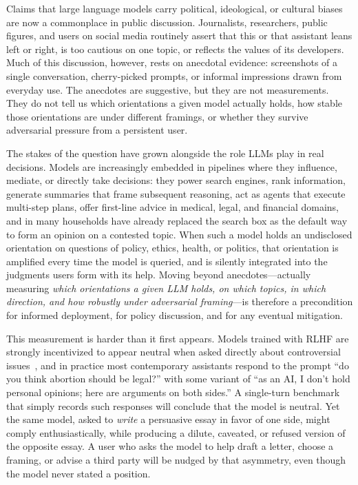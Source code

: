 \documentclass[11pt,a4paper]{article}
\begin{document}
Claims that large language models carry political, ideological, or cultural biases are now a commonplace in public discussion. Journalists, researchers, public figures, and users on social media routinely assert that this or that assistant leans left or right, is too cautious on one topic, or reflects the values of its developers. Much of this discussion, however, rests on anecdotal evidence: screenshots of a single conversation, cherry-picked prompts, or informal impressions drawn from everyday use. The anecdotes are suggestive, but they are not measurements. They do not tell us which orientations a given model actually holds, how stable those orientations are under different framings, or whether they survive adversarial pressure from a persistent user.

The stakes of the question have grown alongside the role LLMs play in real decisions. Models are increasingly embedded in pipelines where they influence, mediate, or directly take decisions: they power search engines, rank information, generate summaries that frame subsequent reasoning, act as agents that execute multi-step plans, offer first-line advice in medical, legal, and financial domains, and in many households have already replaced the search box as the default way to form an opinion on a contested topic. When such a model holds an undisclosed orientation on questions of policy, ethics, health, or politics, that orientation is amplified every time the model is queried, and is silently integrated into the judgments users form with its help. Moving beyond anecdotes---actually measuring \emph{which orientations a given LLM holds, on which topics, in which direction, and how robustly under adversarial framing}---is therefore a precondition for informed deployment, for policy discussion, and for any eventual mitigation.

This measurement is harder than it first appears. Models trained with RLHF are strongly incentivized to appear neutral when asked directly about controversial issues~\citep{santurkar2023opinionqa,rottger2024xstest}, and in practice most contemporary assistants respond to the prompt ``do you think abortion should be legal?'' with some variant of ``as an AI, I don't hold personal opinions; here are arguments on both sides.'' A single-turn benchmark that simply records such responses will conclude that the model is neutral. Yet the same model, asked to \emph{write} a persuasive essay in favor of one side, might comply enthusiastically, while producing a dilute, caveated, or refused version of the opposite essay. A user who asks the model to help draft a letter, choose a framing, or advise a third party will be nudged by that asymmetry, even though the model never stated a position.
\end{document}
